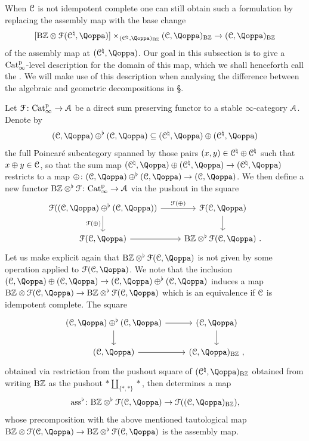 When $\mathcal C$ is not idempotent complete one can still obtain such a formulation by replacing the assembly map with the base change  
\[
[\B\ZZ \otimes \F(\C^{\natural},\QF)] \times_{(\C^{\natural},\QF)_{\B\ZZ}} (\C,\QF)_{\B\ZZ} \to (\C,\QF)_{\B\ZZ}
\]
of the assembly map at $(\C^{\natural},\QF)$.
Our goal in this subsection is to give a $\mathrm{Cat}^{\mathrm p}_\infty$-level description for the domain of this map, which we shall henceforth call the .
We will make use of this description when %
analysing the difference between the algebraic and geometric decompositions in \S{}.

\begin{construction}
\label{construction:ext-ass}%
Let $\mathcal{F}\colon \mathrm{Cat}^{\mathrm p}_\infty \to \mathcal{A}$ be a direct sum preserving functor to a stable $\infty$-category $\mathcal{A}$. 
Denote by 
\[
(\C,\QF) \oplus^{\flat} (\C,\QF) \subseteq (\C^{\natural},\QF) \oplus (\C^{\natural},\QF)
\]
the full Poincaré subcategory spanned by those pairs $(x,y) \in \mathcal C^{\natural} \oplus \mathcal C^{\natural}$ such that $x \oplus y \in \mathcal C$, so that the sum map $(\C^\natural,\QF) \oplus (\C^{\natural},\QF) \to (\C^{\natural},\QF)$ restricts to a map $\oplus\colon(\C,\QF) \oplus^{\flat} (\C,\QF) \to (\C,\QF)$. We then define a new functor ${\mathrm{B}\mathbb{Z}} \otimes^{\flat}\mathcal{F} \colon \mathrm{Cat}^{\mathrm p}_\infty \rightarrow \mathcal{A}$ via the pushout in the square
\[
\begin{tikzcd}
\F((\C,\QF) \oplus^{\flat} (\C,\QF)) \ar[r,"\F(\oplus)"]\ar[d,"\F(\oplus)"'] & \F(\C,\QF) \ar[d] \\
\F(\C,\QF) \ar[r] & {\B\ZZ} \otimes^{\flat} \F(\C,\QF) \ .
\end{tikzcd}
\]
Let us make explicit again that ${\B\ZZ} \otimes^{\flat} \F(\C,\QF)$ is not given by some operation applied to $\F(\C,\QF)$. We note that the inclusion $(\C,\QF) \oplus (\C,\QF) \to (\C,\QF) \oplus^\flat (\C,\QF)$ induces a map $\B\ZZ \otimes \F(\C,\QF) \to \B\ZZ \otimes^\flat \F(\C,\QF)$ which is an equivalence if $\mathcal C$ is idempotent complete.
The square
\[
\begin{tikzcd}
(\C,\QF) \oplus^{\flat} (\C,\QF) \ar[r]\ar[d] & (\C,\QF) \ar[d] \\
(\C,\QF) \ar[r] & (\C,\QF)_{\B\ZZ} \ ,
\end{tikzcd}
\]
obtained via restriction from the pushout square of $(\C^{\natural},\QF)_{\B\ZZ}$ obtained from writing $\mathrm{B}\mathbb{Z}$ as the pushout $\ast \amalg_{\{\ast,\ast\}} \ast$, then determines a map
\[
\ass^{\flat}\colon {\B\ZZ} \otimes^{\flat} \F(\C,\QF) \to \F((\C,\QF)_{\B\ZZ}) ,
\]
whose precomposition with the above mentioned tautological map $\B\ZZ \otimes \F(\C,\QF) \to \B\ZZ \otimes^\flat \F(\C,\QF)$ is the assembly map. 
\end{construction}

